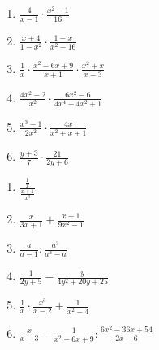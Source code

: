 \begin{exercicios}
    \begin{multicols}{3}{\large
        \begin{enumerate} [label=\alph*)]
            \item $\frac{4}{x-1} \cdot \frac{x^2-1}{16}$
            
            \item $\frac{x+4}{1-x^2} \cdot \frac{1-x}{x^2-16}$
            
            \item $\frac{1}{x} \cdot \frac{x^2-6x+9}{x+1} \cdot \frac{x^2+x}{x-3}$
            
            \item $\frac{4x^2-2}{x^2} \cdot \frac{6x^2-6}{4x^4-4x^2+1}$
            
            \item $\frac{x^3-1}{2x^2} \cdot \frac{4x}{x^2+x+1}$
            
            \item $\frac{y+3}{7} \cdot \frac{21}{2y+6}$
        \end{enumerate}
    }\end{multicols}
    
    
    \begin{multicols}{2}{\large
        \begin{enumerate} [label=\alph*)]
            \item {\Large $\frac{\frac{1}{x}}{\frac{x+1}{x^3}}$}
            
            \item $\frac{x}{3x+1} + \frac{x+1}{9x^2-1}$
            
            \item $\frac{a}{a-1} : \frac{a^3}{a^3-a}$
            
            \item $\frac{1}{2y+5} - \frac{y}{4y^2+20y+25}$
            
            \item $\frac{1}{x} \cdot \frac{x^3}{x-2} + \frac{1}{x^2-4}$
            
            \item $\frac{x}{x-3} - \frac{1}{x^2-6x+9} : \frac{6x^2-36x+54}{2x-6}$
        \end{enumerate}
    }\end{multicols}

\end{exercicios}
\newpage
